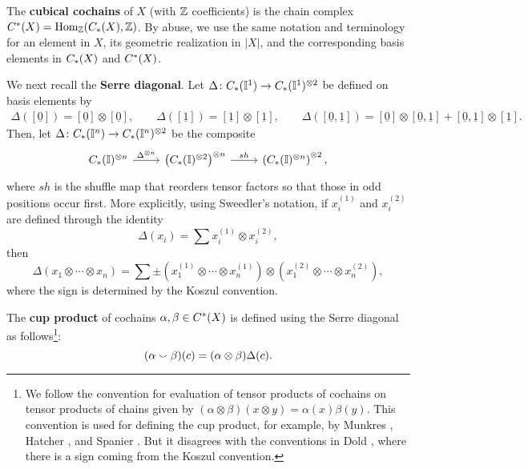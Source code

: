 The \textbf{cubical cochains} of $X$ (with $\mathbb{Z}$ coefficients) is the chain complex $C^{\ast}(X) = \textup{Hom}_{\mathbb{Z}}(C_{\ast}(X), \mathbb{Z})$.
By abuse, we use the same notation and terminology for an element in $X$, its geometric realization in $|X|$,
and the corresponding basis elements in $C_{\ast}(X)$ and $C^{\ast}(X)$.

We next recall the \textbf{Serre diagonal}.
Let $\Delta \colon C_{\ast}(\mathbb{I}^1) \to C_{\ast}(\mathbb{I}^1)^{\otimes 2}$ be defined on basis elements by
\begin{gather*}
	\Delta([\underline{0}]) = [\underline{0}] \otimes [\underline{0}], \qquad
	\Delta([\underline{1}]) = [\underline{1}] \otimes [\underline{1}], \qquad
	\Delta([\underline{0}, \underline{1}]) = [\underline{0}] \otimes [\underline{0}, \underline{1}] + [\underline{0}, \underline{1}] \otimes [\underline{1}].
\end{gather*}
Then, let
$\Delta \colon C_{\ast}(\mathbb{I}^n) \to C_{\ast}(\mathbb{I}^n)^{\otimes 2}$
be the composite
\[
\begin{tikzcd}
	\chains(\interval)^{\otimes n} \arrow[r, "\Delta^{\otimes n}"] & \left( \chains(\interval)^{\otimes 2} \right)^{\otimes n} \arrow[r, "sh"] & \left( \chains(\interval)^{\otimes n} \right)^{\otimes 2},
\end{tikzcd}
\]
where $sh$ is the shuffle map that reorders tensor factors so that those in odd positions occur first.
More explicitly, using Sweedler's notation, if $x_i^{(1)}$ and $x_i^{(2)}$ are defined through the identity
\[
\Delta(x_i) = \sum x_i^{(1)} \otimes x_i^{(2)},
\]
then
\begin{equation}\label{E:Delta}
	\Delta (x_1 \otimes \cdots \otimes x_n) =
	\sum \pm \left( x_1^{(1)} \otimes \cdots \otimes x_n^{(1)} \right) \otimes
	\left( x_1^{(2)} \otimes \cdots \otimes x_n^{(2)} \right),
\end{equation}
where the sign is determined by the Koszul convention.

The \textbf{cup product} of cochains $\alpha, \beta \in C^{\ast}(X)$ is defined using the Serre diagonal as follows\footnote{
	We follow the convention for evaluation of tensor products of cochains on tensor products of chains given by $(\alpha\otimes \beta)(x\otimes y)=\alpha(x)\beta(y)$. This convention is used for defining the cup product, for example, by Munkres \cite[Section 60]{Munk84}, Hatcher \cite[Section 3.2]{Hat02}, and Spanier \cite[Section 5.6]{Spa81}. But it disagrees with the conventions in Dold \cite[Section VII.7]{Dol72}, where there is a sign coming from the Koszul convention.
}:
\[
(\alpha \smallsmile \beta)(c) = (\alpha \otimes \beta)\Delta(c).
\]

